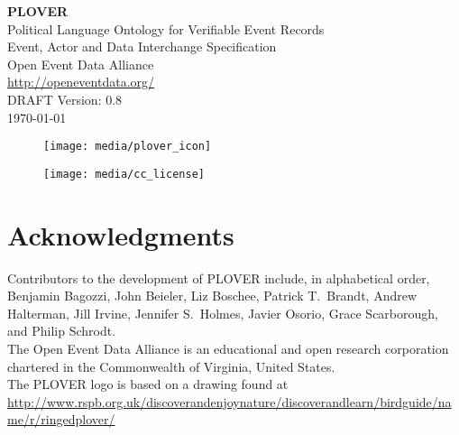 \documentclass[11pt]{report}
\begin{document}

\vspace{-10pt}	

      \begin{center}
            {\Huge \bfseries PLOVER\ }\\[2ex] 
            {\LARGE Political Language Ontology for Verifiable Event Records\\ [2ex]Event, Actor and Data Interchange Specification}\\[10ex] 
            {\LARGE Open Event Data Alliance} \\[2ex] 
            {\Large \url{http://openeventdata.org/} }\\[2ex] 
            {\LARGE DRAFT Version: 0.8\\ [2EX]\monthyeardate\today}
        \end{center}


\begin{figure}[h!]
\centering
\texttt{[image: media/plover\_icon]}
\end{figure}

\vspace{20pt}	


\begin{figure}[h!]
\centering
\texttt{[image: media/cc\_license]}
\end{figure}






\chapter*{Acknowledgments}

\noindent Contributors to the development of PLOVER include, in alphabetical order, Benjamin Bagozzi, John Beieler, Liz Boschee, Patrick T.~Brandt, Andrew Halterman, Jill Irvine, Jennifer S.~Holmes, Javier Osorio, Grace Scarborough, and Philip Schrodt.\\

\noindent The Open Event Data Alliance is an educational and open research corporation chartered in the Commonwealth of Virginia, United States.\\

\noindent The PLOVER logo is based on a drawing found at\\ \url{http://www.rspb.org.uk/discoverandenjoynature/discoverandlearn/birdguide/name/r/ringedplover/}\\
\end{document}
